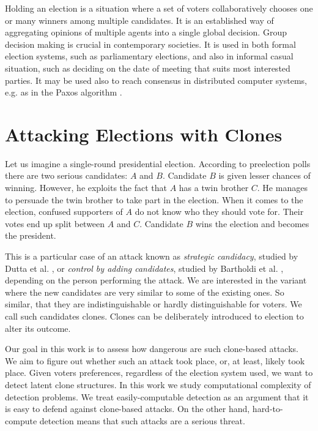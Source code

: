 Holding an election is a situation where a set of voters collaboratively chooses
one or many winners among multiple candidates.
It is an established way of aggregating opinions of multiple agents into a single global decision.
Group decision making is crucial in contemporary societies.
It is used in both formal election systems, such as parliamentary elections,
and also in informal casual situation, such as deciding on the date of meeting that suits most interested parties.
It may be used also to reach consensus in distributed computer systems, e.g. as in the Paxos algorithm \cite{paxos}.

\section{Attacking Elections with Clones}

Let us imagine a single-round presidential election.
According to preelection polls there are two serious candidates: $A$ and $B$.
Candidate $B$ is given lesser chances of winning.
However, he exploits the fact that $A$ has a twin brother $C$.
He manages to persuade the twin brother to take part in the election.
When it comes to the election, confused supporters of $A$ do not know who they should vote for.
Their votes end up split between $A$ and $C$.
Candidate $B$ wins the election and becomes the president.

This is a particular case of an attack known as \textit{strategic candidacy},
studied by Dutta et al. \cite{strategiccandidacy},
or \textit{control by adding candidates}, studied by Bartholdi et al. \cite{controlbyadding},
depending on the person performing the attack.
We are interested in the variant where the new candidates are very similar to some of the existing ones.
So similar, that they are indistinguishable or hardly distinguishable for voters.
We call such candidates clones.
Clones can be deliberately introduced to election to alter its outcome.

Our goal in this work is to assess how dangerous are such clone-based attacks.
We aim to figure out whether such an attack took place, or, at least, likely took place.
Given voters preferences, regardless of the election system used, we want to detect latent clone structures.
In this work we study computational complexity of detection problems.
We treat easily-computable detection as an argument that it is easy to defend against clone-based attacks.
On the other hand, hard-to-compute detection means that such attacks are a serious threat.

